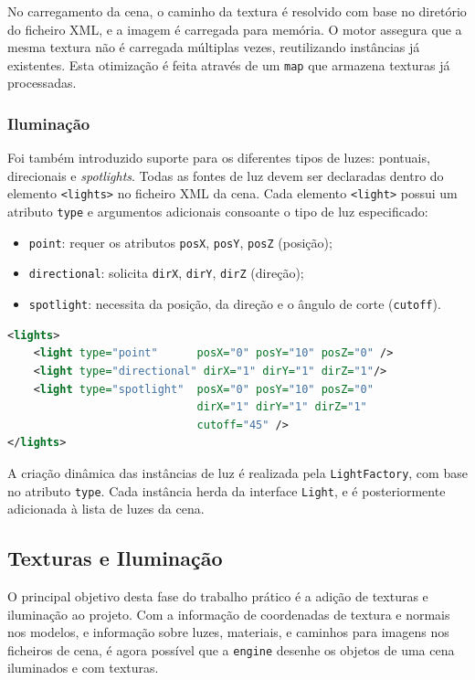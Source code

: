 \documentclass[12pt, a4paper]{article}
\begin{document}
No carregamento da cena, o caminho da textura é resolvido com base no diretório do ficheiro XML, e
a imagem é carregada para memória. O motor assegura que a mesma textura não é carregada múltiplas
vezes, reutilizando instâncias já existentes. Esta otimização é feita através de um \texttt{map}
que armazena texturas já processadas.

\subsubsection{Iluminação}

Foi também introduzido suporte para os diferentes tipos de luzes: pontuais, direcionais e
\emph{spotlights}. Todas as fontes de luz devem ser declaradas dentro do elemento \texttt{<lights>}
no ficheiro XML da cena. Cada elemento \texttt{<light>} possui um atributo \texttt{type} e
argumentos adicionais consoante o tipo de luz especificado:

\begin{itemize}
    \item \texttt{point}: requer os atributos \texttt{posX}, \texttt{posY}, \texttt{posZ} (posição);
    \item \texttt{directional}: solicita \texttt{dirX}, \texttt{dirY}, \texttt{dirZ} (direção);
    \item \texttt{spotlight}: necessita da posição, da direção e o ângulo de corte
    (\texttt{cutoff}).
\end{itemize}

\begin{lstlisting}[language=xml]
<lights>
    <light type="point"      posX="0" posY="10" posZ="0" />
    <light type="directional" dirX="1" dirY="1" dirZ="1"/>
    <light type="spotlight"  posX="0" posY="10" posZ="0"
                             dirX="1" dirY="1" dirZ="1"
                             cutoff="45" />
</lights>
\end{lstlisting}

A criação dinâmica das instâncias de luz é realizada pela \texttt{LightFactory}, com base no
atributo \texttt{type}. Cada instância herda da interface \texttt{Light}, e é posteriormente
adicionada à lista de luzes da cena.

\subsection{Texturas e Iluminação}

O principal objetivo desta fase do trabalho prático é a adição de texturas e iluminação ao projeto.
Com a informação de coordenadas de textura e normais nos modelos, e informação sobre luzes,
materiais, e caminhos para imagens nos ficheiros de cena, é agora possível que a \texttt{engine}
desenhe os objetos de uma cena iluminados e com texturas.
\end{document}
